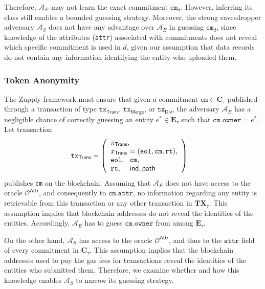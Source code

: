 Therefore, \( \mathcal{A}_E \) may not learn the exact commitment \( \texttt{cm}_d \). However, inferring its class still enables a bounded guessing strategy. Moreover, the strong eavesdropper adversary \( \mathcal{A}_S \) does not have any advantage over \( \mathcal{A}_E \) in guessing \( \texttt{cm}_d \), since knowledge of the attributes (\texttt{attr}) associated with commitments does not reveal which specific commitment is used in \( d \), given our assumption that data records do not contain any information identifying the entity who uploaded them.

\subsubsection{Token Anonymity}
The Zupply framework must ensure that  given a commitment $\texttt{cm} \in \mathbf{C}_\tau$ published through a transaction of type $\texttt{tx}_\textsf{Trans}$, $\texttt{tx}_\textsf{Merge}$, or $\texttt{tx}_\textsf{Div}$, the adversary   \( \mathcal{A}_E \)  has a negligible chance of correctly guessing an entity $e^* \in \mathbf{E}_\tau$ such that $\texttt{cm}.\texttt{owner} = e^*$. Let transaction
\begin{align}\label{eq:tx_trans}
	\texttt{tx}_\mathsf{Trans} & = \left( 
	\begin{array}{l@{\hspace{0.05em}}l}
		\pi_{\mathsf{Trans}}, & \\
		x_{\mathsf{Trans}} & = (\texttt{eol}, \texttt{cm}, \texttt{rt}) ,\\
		\texttt{eol}, & \texttt{cm}, \\
		\texttt{rt}, & \mathsf{ind}, \mathsf{path}
	\end{array} 
	\right)
\end{align}
publishes \texttt{cm} on the blockchain. Assuming that \( \mathcal{A}_E \) does not have access to the oracle \( \mathcal{O}^\mathsf{Attr} \), and consequently to \( \texttt{cm}.\texttt{attr} \), no information regarding any entity is retrievable from this transaction or any other transaction in \( \mathbf{TX}_\tau \). This assumption implies that blockchain addresses do not reveal the identities of the entities. Accordingly, \( \mathcal{A}_E \) has to guess \( \texttt{cm}.\texttt{owner} \) from among \( \mathbf{E}_\tau \).

On the other hand, \( \mathcal{A}_S \) has access to the oracle \( \mathcal{O}^\mathsf{Attr} \), and thus to the \( \texttt{attr} \) field of every commitment in \( \mathbf{C}_\tau \). This assumption implies that the blockchain addresses used to pay the gas fees for transactions reveal the identities of the entities who submitted them. Therefore, we examine whether and how this knowledge enables \( \mathcal{A}_S \) to narrow its guessing strategy.

